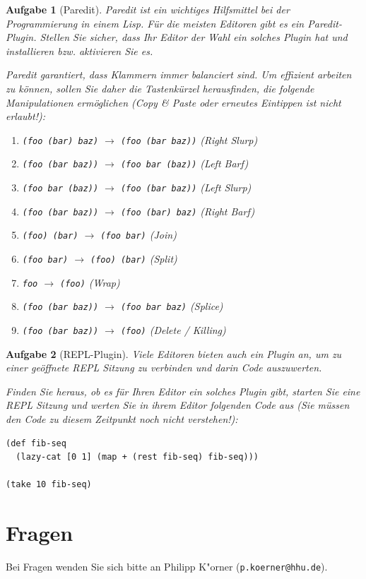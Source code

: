 \documentclass[11pt,a4paper]{article}
\newcounter{numb}
\theoremstyle{break}
\newtheorem{aufgabe}{Aufgabe}[numb]
\begin{document}
\begin{aufgabe}[Paredit]
    Paredit ist ein wichtiges Hilfsmittel bei der Programmierung in einem Lisp.
    F\"ur die meisten Editoren gibt es ein Paredit-Plugin.
    Stellen Sie sicher, dass Ihr Editor der Wahl ein solches Plugin hat
    und installieren bzw. aktivieren Sie es.


    Paredit garantiert, dass Klammern immer balanciert sind.
    Um effizient arbeiten zu k\"onnen, sollen Sie daher
    die Tastenk\"urzel herausfinden, die folgende Manipulationen erm\"oglichen
    (Copy \& Paste oder erneutes Eintippen ist nicht erlaubt!):

    \begin{enumerate}[label=\alph*)]
\item
  \texttt{(foo (bar) baz)} $\longrightarrow$ \texttt{(foo (bar baz))} \textit{(Right Slurp)}
\item
  \texttt{(foo (bar baz))} $\longrightarrow$ \texttt{(foo bar (baz))} \textit{(Left Barf)}
\item
  \texttt{(foo bar (baz))} $\longrightarrow$ \texttt{(foo (bar baz))} \textit{(Left Slurp)}
\item
  \texttt{(foo (bar baz))} $\longrightarrow$ \texttt{(foo (bar) baz)} \textit{(Right Barf)}
\item
  \texttt{(foo) (bar)} $\longrightarrow$ \texttt{(foo bar)} \textit{(Join)}
\item
  \texttt{(foo bar)} $\longrightarrow$ \texttt{(foo) (bar)} \textit{(Split)}
\item
  \texttt{foo} $\longrightarrow$ \texttt{(foo)} \textit{(Wrap)}
\item
  \texttt{(foo (bar baz))} $\longrightarrow$ \texttt{(foo bar baz)} \textit{(Splice)}
\item
  \texttt{(foo (bar baz))} $\longrightarrow$ \texttt{(foo)} \textit{(Delete / Killing)}
\end{enumerate}

\end{aufgabe}

\begin{aufgabe}[REPL-Plugin]
    Viele Editoren bieten auch ein Plugin an,
    um zu einer ge\"offnete REPL Sitzung zu verbinden
    und darin Code auszuwerten.

    Finden Sie heraus, ob es f\"ur Ihren Editor ein solches Plugin gibt,
    starten Sie eine REPL Sitzung und werten Sie in ihrem Editor folgenden
    Code aus (Sie m\"ussen den Code zu diesem Zeitpunkt noch nicht verstehen!):

\begin{verbatim}
(def fib-seq
  (lazy-cat [0 1] (map + (rest fib-seq) fib-seq)))

(take 10 fib-seq)
\end{verbatim}
\end{aufgabe}


\section*{Fragen}
Bei Fragen wenden Sie sich bitte an Philipp K"orner (\texttt{p.koerner@hhu.de}).
\end{document}
